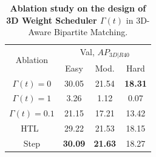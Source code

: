 \begin{table}[h!]
    \centering
    \caption{\textbf{Ablation study on the design of 3D Weight Scheduler $\Gamma(t)$} in 3D-Aware Bipartite Matching.}
    \begin{tabular}{c|ccc}
         \toprule
         \multirow{2}{*}{Ablation} & \multicolumn{3}{c}{Val, $AP_{3D|R40}$} \\
          & Easy & Mod. & Hard \\ \midrule \midrule
          $\Gamma(t)=0$ & 30.05 & 21.54 & \textbf{18.31} \\
          $\Gamma(t)=1$ & 3.26 & 1.12 & 0.07 \\
          $\Gamma(t)=0.1$ & 21.15 & 17.21 & 13.42 \\
          HTL~\cite{GUPNet} & 29.22 & 21.53 & 18.15 \\
          Step & \textbf{30.09} & \textbf{21.63} & 18.27 \\
         \bottomrule
    \end{tabular}
    \label{tab:3d_weight_scheduler}
\end{table}